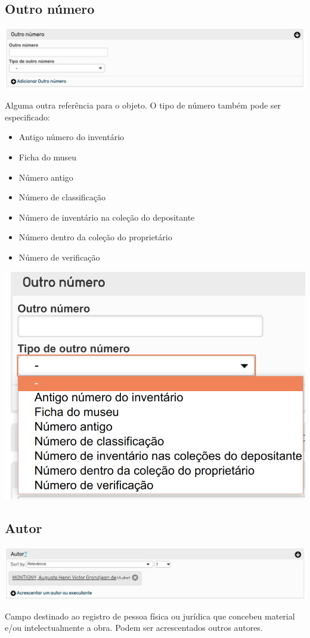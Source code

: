 \subsection{Outro número}
\begin{flushleft}
	\includegraphics[width=\linewidth]{elemento-02}
\end{flushleft}
Alguma outra referência para o objeto. O tipo de número também pode ser especificado:
\begin{itemize}
	\item Antigo número do inventário
	\item Ficha do museu
	\item Número antigo
	\item Número de classificação
	\item Número de inventário na coleção do depositante
	\item Número dentro da coleção do proprietário
	\item Número de verificação
\end{itemize}
\begin{flushleft}
	\includegraphics[width=0.5\linewidth]{tipoOutroNumero}
\end{flushleft}
\subsection{Autor}
\begin{flushleft}
	\includegraphics[width=\linewidth]{autor-01}
\end{flushleft}
Campo destinado ao registro de pessoa física ou jurídica que concebeu material e/ou intelectualmente a obra. Podem ser acrescentados outros autores.

